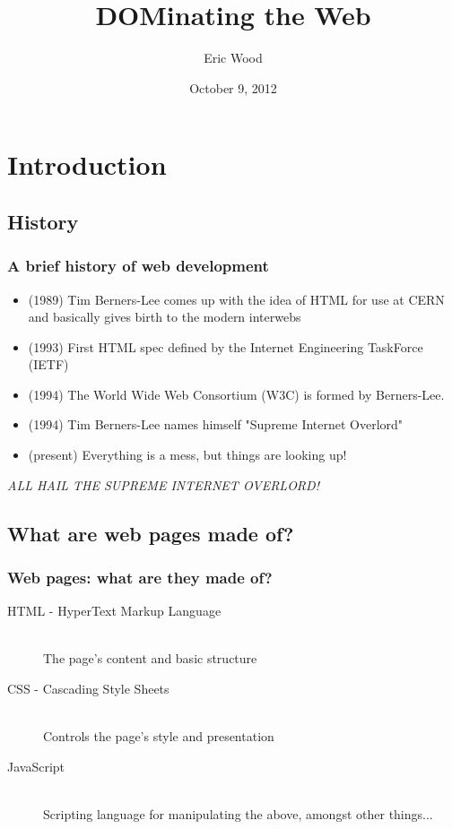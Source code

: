 \documentclass[10pt]{beamer}
\title{DOMinating the Web}
\author{Eric Wood}
\date{October 9, 2012}
\begin{document}
\maketitle


\section{Introduction}
\subsection{History}
\frame
{
  \frametitle{A brief history of web development}
  \begin{itemize}
    \item (1989) Tim Berners-Lee comes up with the idea of HTML for use at CERN and basically gives birth to the modern interwebs
    \item (1993) First HTML spec defined by the Internet Engineering TaskForce (IETF)
    \item (1994) The World Wide Web Consortium (W3C) is formed by Berners-Lee.
    \item (1994) Tim Berners-Lee names himself "Supreme Internet Overlord"
    \item (present) Everything is a mess, but things are looking up!
  \end{itemize}

  \emph{ALL HAIL THE SUPREME INTERNET OVERLORD!}
}

\subsection{What are web pages made of?}
\frame
{
  \frametitle{Web pages: what are they made of?}

  \begin{description}
    \item[HTML - HyperText Markup Language] \hfill \\
      The page's content and basic structure
    \item[CSS - Cascading Style Sheets] \hfill \\
      Controls the page's style and presentation
    \item[JavaScript] \hfill \\
      Scripting language for manipulating the above, amongst other things...
  \end{description}
}
\end{document}
